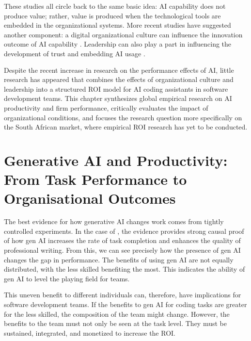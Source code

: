 These studies all circle back to the same basic idea: AI capability does not produce value; rather, value is produced when the technological tools are embedded in the organizational systems. More recent studies have suggested another component: a digital organizational culture can influence the innovation outcome of AI capability \autocite{An2024}. Leadership can also play a part in influencing the development of trust and embedding AI usage \autocite{Schneider2023}.

Despite the recent increase in research on the performance effects of AI, little research has appeared that combines the effects of organizational culture and leadership into a structured ROI model for AI coding assistants in software development teams. This chapter synthesizes global empirical research on AI productivity and firm performance, critically evaluates the impact of organizational conditions, and focuses the research question more specifically on the South African market, where empirical ROI research has yet to be conducted.

\section{Generative AI and Productivity: From Task Performance to Organisational Outcomes}
\label{sec:Generative AI and Productivity: From Task Performance to Organisational Outcomes}

The best evidence for how generative AI changes work comes from tightly controlled 
experiments. In the case of \textcite{Noy2023}, the evidence provides strong causal proof of how gen AI increases the rate of task completion and enhances the quality of professional writing. From this, we can see precisely how the presence of gen AI changes the gap in performance. The benefits of using gen AI are not equally distributed, with the less skilled benefiting the most. This indicates the ability of gen AI to level the playing field for teams.

This uneven benefit to different individuals can, therefore, have implications for software 
development teams. If the benefits to gen AI for coding tasks are greater for the less skilled, the composition of the team might change. However, the benefits to the team must not only be seen at the task level. They must be sustained, integrated, and monetized to increase the ROI.

